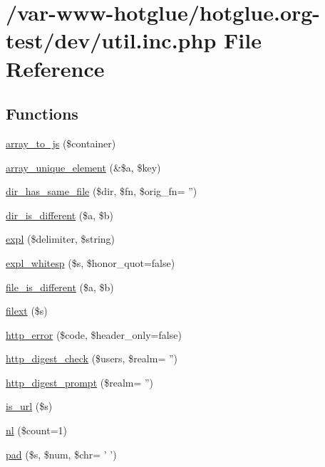 \hypertarget{util_8inc_8php}{
\section{/var-\/www-\/hotglue/hotglue.org-\/test/dev/util.inc.php File Reference}
\label{util_8inc_8php}
}
\subsection*{Functions}
\begin{DoxyCompactItemize}
\item 
\hyperlink{util_8inc_8php_a61d3b2881d9368741c71509017724bc8}{array\_\-to\_\-js} (\$container)
\item 
\hyperlink{util_8inc_8php_a4647462c98447c6c2842f70d8c313f85}{array\_\-unique\_\-element} (\&\$a, \$key)
\item 
\hyperlink{util_8inc_8php_a7f3e06b0a6f405290cb4d7990b8ac5c6}{dir\_\-has\_\-same\_\-file} (\$dir, \$fn, \$orig\_\-fn= '')
\item 
\hyperlink{util_8inc_8php_a6309f576f2611237288d0dd3eed09db3}{dir\_\-is\_\-different} (\$a, \$b)
\item 
\hyperlink{util_8inc_8php_aafce787d4b725ac62be6306ff3e352e7}{expl} (\$delimiter, \$string)
\item 
\hyperlink{util_8inc_8php_a1d2500a5e237e59956b03cbea845c95a}{expl\_\-whitesp} (\$s, \$honor\_\-quot=false)
\item 
\hyperlink{util_8inc_8php_a9c9a81ec9dba8b2870cbb365f8139866}{file\_\-is\_\-different} (\$a, \$b)
\item 
\hyperlink{util_8inc_8php_a6d9392e51344c2e8720a0c1982ebea21}{filext} (\$s)
\item 
\hyperlink{util_8inc_8php_ae51039516309f10d5be73220f351e808}{http\_\-error} (\$code, \$header\_\-only=false)
\item 
\hyperlink{util_8inc_8php_aff065fbc9f3abbf9c5a0ebfba22acbf7}{http\_\-digest\_\-check} (\$users, \$realm= '')
\item 
\hyperlink{util_8inc_8php_a95d221746e2d296434b0d63f78cedf57}{http\_\-digest\_\-prompt} (\$realm= '')
\item 
\hyperlink{util_8inc_8php_a0da48011cb68c039aec396c23cb04295}{is\_\-url} (\$s)
\item 
\hyperlink{util_8inc_8php_a9f9eeab2eb9a39518e80609fc7f83842}{nl} (\$count=1)
\item 
\hyperlink{util_8inc_8php_a37ef346387afe0af2cf86a8bea887173}{pad} (\$s, \$num, \$chr= ' ')

\end{DoxyCompactItemize}
